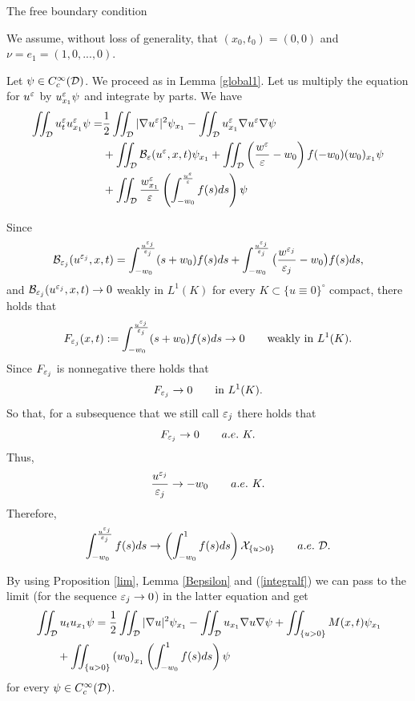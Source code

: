 \begin{section}{The free boundary condition}
\begin{pf}
We assume, without loss of generality, that $(x_0,t_0)=(0,0)$ and $\nu=e_1=(1,0,...,0)$.

Let $\psi\in C^{\infty}_c({\cal D})$. We proceed as in Lemma \ref{global1}.
Let us multiply the equation for
$u^\varepsilon$ by $u_{x_1}^{\varepsilon}\psi$ and integrate by parts. We have
\begin{align*}
\iint_{\cal D}u^{\varepsilon}_t u^{\varepsilon}_{x_1}\psi = &\frac12 \iint_{\cal D} 
|\nabla u^{\varepsilon}|^2 \psi_{x_1} - 
\iint_{\cal D}u^{\varepsilon}_{x_1}\nabla u^{\varepsilon} \nabla \psi \\
&+\iint_{\cal D} {\cal B}_{\varepsilon}(u^{\varepsilon},x,t)\psi_{x_1} + 
\iint_{{\cal D}}\left(\frac{w^\varepsilon}{\varepsilon}-w_0\right)f(-w_0)(w_0)_{x_1}\psi\\
&+\iint_{\cal D} \frac{w^{\varepsilon}_{x_1}}{\varepsilon} \left(\int_{-w_0}^{\frac{u^{\varepsilon}}{\varepsilon}}
f(s) ds\right)\psi
\end{align*}

Since
$$
{\cal B}_{{\varepsilon_j}}(u^{\varepsilon_j},x,t)=\int_{-w_0}^{\frac{u^{\varepsilon_j}}{{\varepsilon_j}}}(s+w_0)f(s)ds +\int_{-w_0}^
{\frac{u^{\varepsilon_j}}{{\varepsilon_j}}}\big(\frac{w^{\varepsilon_j}}{{\varepsilon_j}}-w_0\big)f(s)ds,
$$
and ${\cal B}_{{\varepsilon_j}}(u^{\varepsilon_j},x,t)\to 0$ weakly in $L^1(K)$ for every $K\subset\{u\equiv0\}^\circ$
compact, there holds that
$$
F_{{\varepsilon_j}}(x,t):=\int_{-w_0}^{\frac{u^{\varepsilon_j}}{{\varepsilon_j}}}(s+w_0)f(s)ds\to0\qquad\mbox{weakly in }L^1(K).
$$
Since $F_{{\varepsilon_j}}$ is nonnegative there holds that
$$
F_{{\varepsilon_j}}\to0\qquad\mbox{in }L^1(K).
$$
So that, for a subsequence that we still call ${\varepsilon_j}$ there holds that
$$
F_{{\varepsilon_j}}\to0\qquad a.e.\ K.
$$
Thus,  
$$
\frac{\uepj}{\epj}\to -w_0\qquad a. e.\ K.
$$
Therefore,
\begin{equation}
\label{integralf}
\int_{-w_0}^{\frac{u^{\varepsilon_j}}{{\varepsilon_j}}}f(s)ds\to\left(\int_{-w_0}^1f(s)ds\right){\cal X}_
{\{u>0\}}\qquad a.e.\ {\cal D}.
\end{equation}



By using Proposition \ref{lim}, Lemma \ref{Bepsilon} and (\ref{integralf})
we can pass to
the limit (for the sequence $\varepsilon_j\to 0$) in the latter equation and get
\begin{equation}
\begin{aligned}
\label{u1}
&\iint_{\cal D} u_t u_{x_1}\psi = \frac12 \iint_{\cal D} 
|\nabla u|^2 \psi_{x_1} - \iint_{\cal D} u_{x_1}\nabla u \nabla \psi + 
\iint_{\{ u>0 \}}M(x,t) \psi_{x_1}\\
&\qquad+\iint_{\{u>0\}} {(w_0)}_{x_1} \left(\int_{-w_0}^1 f(s) ds\right)\psi
\end{aligned}
\end{equation}
for every $\psi\in C^{\infty}_c({\cal D})$.


\end{pf}
\end{section}
